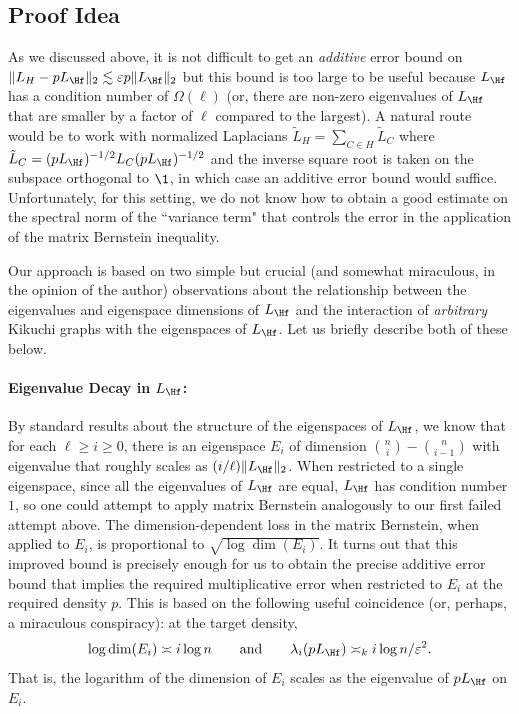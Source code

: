 \documentclass
[11pt,letterpaper]
{article}
\renewcommand{\epsilon}{\varepsilon}
\begin{document}
\subsection{Proof Idea}
As we discussed above, it is not difficult to get an \emph{additive} error bound on $\|L_H - pL_{\Hf}\|_2 \lesssim \epsilon p\|L_{\Hf}\|_2$ but this bound is too large to be useful because $L_{\Hf}$ has a condition number of $\Omega(\ell)$ (or, there are non-zero eigenvalues of $L_{\Hf}$ that are smaller by a factor of $\ell$ compared to the largest). A natural route would be to work with normalized Laplacians $\tilde{L}_H = \sum_{C \in H} \tilde{L}_C$ where $\tilde{L}_C = (p L_{\Hf})^{-1/2} L_C (p L_{\Hf})^{-1/2}$ and the inverse square root is taken on the subspace orthogonal to $\1$, in which case an additive error bound would suffice. Unfortunately, for this setting, we do not know how to obtain a good estimate on the spectral norm of the ``variance term" that controls the error in the application of the matrix Bernstein inequality. 

Our approach is based on two simple but crucial (and somewhat miraculous, in the opinion of the author) observations about the relationship between the eigenvalues and eigenspace dimensions of $L_{\Hf}$ and the interaction of \emph{arbitrary} Kikuchi graphs with the eigenspaces of $L_{\Hf}$. Let us briefly describe both of these below. 

\paragraph{Eigenvalue Decay in $L_{\Hf}$:}
By standard results about the structure of the eigenspaces of $L_{\Hf}$, we know that for each $\ell  \geq i \geq 0$, there is an eigenspace $E_i$ of dimension ${n \choose i} -{n\choose {i-1}}$ with eigenvalue that roughly scales as $(i/\ell)\|L_{\Hf}\|_2$. When restricted to a single eigenspace, since all the eigenvalues of $L_{\Hf}$ are equal, $L_{\Hf}$ has condition number $1$, so one could attempt to apply matrix Bernstein analogously to our first failed attempt above. The dimension-dependent loss in the matrix Bernstein, when applied to $E_i$, is proportional to $\sqrt{ \log \dim(E_i)}$. It turns out that this improved bound is precisely enough for us to obtain the precise additive error bound that implies the required multiplicative error when restricted to $E_i$ at the required density $p$. This is based on the following useful coincidence (or, perhaps, a miraculous conspiracy): at the target density,
\[
\log \dim(E_i) \asymp i\log n
\qquad\text{and}\qquad
\lambda_i(pL_{\Hf}) \asymp_k i\log n/\epsilon^2.
\]
That is, the logarithm of the dimension of $E_i$ scales as the eigenvalue of $p L_{\Hf}$ on $E_i$. 
\end{document}
